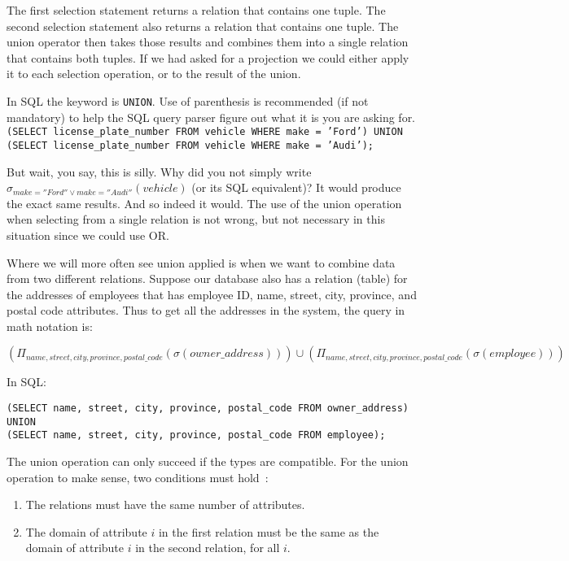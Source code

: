 The first selection statement returns a relation that contains one tuple. The second selection statement also returns a relation that contains one tuple. The union operator then takes those results and combines them into a single relation that contains both tuples. If we had asked for a projection we could either apply it to each selection operation, or to the result of the union.

In SQL the keyword is \texttt{UNION}. Use of parenthesis is recommended (if not mandatory) to help the SQL query parser figure out what it is you are asking for.
\texttt{(SELECT license\_plate\_number FROM vehicle WHERE make = 'Ford') UNION (SELECT license\_plate\_number FROM vehicle WHERE make = 'Audi');}

But wait, you say, this is silly. Why did you not simply write  $\sigma_{make = ''Ford'' \vee make = ''Audi''}( vehicle )$ (or its SQL equivalent)? It would produce the exact same results. And so indeed it would. The use of the union operation when selecting from a single relation is not wrong, but not necessary in this situation since we could use OR. 

Where we will more often see union applied is when we want to combine data from two different relations. Suppose our database also has a relation (table) for the addresses of employees that has employee ID, name, street, city, province, and postal code attributes. Thus to get all the addresses in the system, the query in math notation is:

$(\Pi_{name, street, city, province, postal\_code}(\sigma( owner\_address) )) \cup  (\Pi_{name, street, city, province, postal\_code}(\sigma( employee ) ))$

In SQL:

\texttt{(SELECT name, street, city, province, postal\_code FROM owner\_address)\\ 
UNION\\ 
(SELECT name, street, city, province, postal\_code FROM employee);}

The union operation can only succeed if the types are compatible. For the union operation to make sense, two conditions must hold~\cite{dsc}:

\begin{enumerate}
	\item The relations must have the same number of attributes.
	\item The domain of attribute $i$ in the first relation must be the same as the domain of attribute $i$ in the second relation, for all $i$. 
\end{enumerate}

